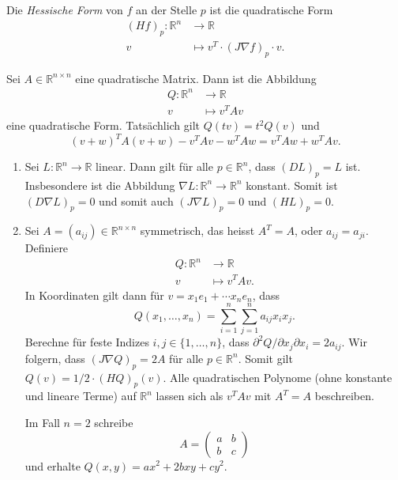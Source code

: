 \documentclass[../main.tex]{subfiles}
\begin{document}
\begin{definition}
  Die \emph{Hessische Form} von $f$ an der Stelle $p$
  ist die quadratische Form
  \begin{align*}
    {(Hf)}_p \colon \mathbb{R}^n & \to \mathbb{R} \\
    v & \mapsto v^T \cdot {(J \nabla f)}_p \cdot v.
  \end{align*}
\end{definition}

\begin{remark}
  Sei $A \in \mathbb{R}^{n \times n}$ eine quadratische Matrix.
  Dann ist die Abbildung
  \begin{align*}
    Q \colon \mathbb{R}^n & \to \mathbb{R} \\
    v & \mapsto v^T A v
  \end{align*}
  eine quadratische Form.
  Tatsächlich gilt $Q(tv) = t^2 Q(v)$ und
  \[
    (v + w)^T A (v + w) - v^T A v - w^T A w
    = v^T A w + w^T A v.
  \]
\end{remark}

\begin{examples}
  \leavevmode
  \begin{enumerate}[(1)]
    \item Sei $L \colon \mathbb{R}^n \to \mathbb{R}$ linear.
      Dann gilt für alle $p \in \mathbb{R}^n$, dass
      ${(DL)}_p = L$ ist.
      Insbesondere ist die Abbildung 
      $\nabla L \colon \mathbb{R}^n \to \mathbb{R}^n$ 
      konstant.
      Somit ist ${(D \nabla L )}_p = 0$ und somit auch
      ${(J \nabla L )}_p = 0$ und ${(HL)}_p = 0$.
    \item Sei $A = (a_{ij}) \in\mathbb{R}^{n \times n}$ symmetrisch,
      das heisst $A^T = A$, oder $a_{ij} = a_{ji}$.
      Definiere
      \begin{align*}
        Q \colon \mathbb{R}^n & \to \mathbb{R} \\
        v & \mapsto v^T A v.
      \end{align*}
      In Koordinaten gilt dann für $v = x_1 e_1 + \cdots x_n e_n$, dass
      \[
        Q(x_1, \dots, x_n) = \sum_{i=1}^{n} \sum_{j=1}^{n} a_{ij} x_i x_j.
      \]
      Berechne für feste Indizes $i, j \in \{1, \dots, n\}$, dass
      \(
        {\partial^2 Q}/{\partial x_j \partial x_i} = 2a_{ij}
      \).
      Wir folgern, dass ${(J \nabla Q)}_p = 2A$ für alle $p \in \mathbb{R}^n$.
      Somit gilt $Q(v) = 1/2 \cdot {(HQ)}_p(v)$.
      Alle quadratischen Polynome (ohne konstante und lineare Terme)
      auf $\mathbb{R}^n$ lassen sich als
      $v^T A v$ mit $A^T = A$ beschreiben.

      Im Fall $n = 2$ schreibe
      \[
        A =
        \begin{pmatrix}
          a & b \\ b & c
        \end{pmatrix}
      \]
      und erhalte
      \(
        Q(x, y) = ax^2 + 2bxy + cy^2
      \).
  \end{enumerate}
\end{examples}
\end{document}
